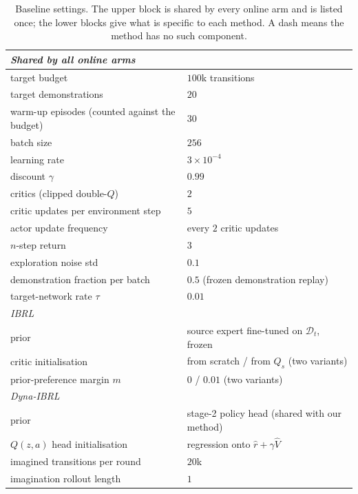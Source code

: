 \begin{table}[h]
\centering
\caption{Baseline settings. The upper block is shared by every online arm and is
listed once; the lower blocks give what is specific to each method. A dash means
the method has no such component.}
\label{tab:app-baselines}
\small
\begin{tabular}{ll}
\toprule
\multicolumn{2}{l}{\emph{Shared by all online arms}} \\
\midrule
target budget                     & $100$k transitions \\
target demonstrations             & $20$ \\
warm-up episodes (counted against the budget) & $30$ \\
batch size                        & $256$ \\
learning rate                     & $3{\times}10^{-4}$ \\
discount $\gamma$                 & $0.99$ \\
critics (clipped double-$Q$)      & $2$ \\
critic updates per environment step & $5$ \\
actor update frequency            & every $2$ critic updates \\
$n$-step return                   & $3$ \\
exploration noise std             & $0.1$ \\
demonstration fraction per batch  & $0.5$ (frozen demonstration replay) \\
target-network rate $\tau$        & $0.01$ \\
\midrule
\multicolumn{2}{l}{\emph{IBRL}} \\
\midrule
prior                             & source expert fine-tuned on $\mathcal{D}_t$, frozen \\
critic initialisation             & from scratch / from $Q_s$ (two variants) \\
prior-preference margin $m$       & $0$ / $0.01$ (two variants) \\
\midrule
\multicolumn{2}{l}{\emph{Dyna-IBRL}} \\
\midrule
prior                             & stage-2 policy head (shared with our method) \\
$Q(z,a)$ head initialisation      & regression onto $\hat r + \gamma \hat V$ \\
imagined transitions per round    & $20$k \\
imagination rollout length        & $1$ \\

\end{tabular}
\end{table}
